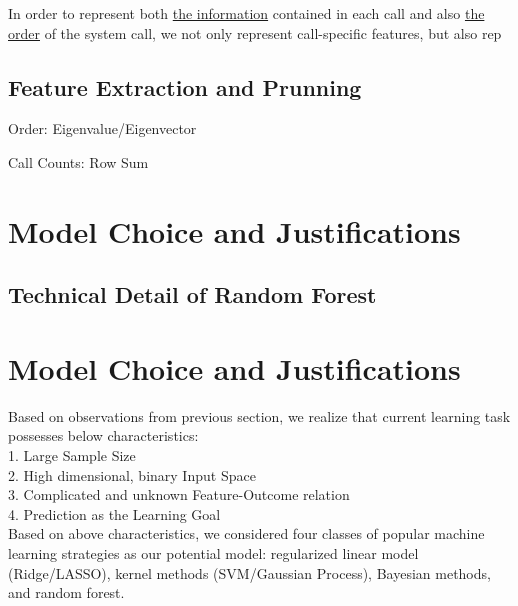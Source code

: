 \documentclass[11pt]{article}
\theoremstyle{definition}
\begin{document}
In order to represent both \underline{the information} contained in each call and also \underline{the order} of the system call, we not only represent call-specific features, but also rep


\subsection{\textbf{Feature Extraction and Prunning}}




Order: Eigenvalue/Eigenvector

Call Counts: Row Sum



\section{\textbf{Model Choice and Justifications}}




\subsection{\textbf{Technical Detail of Random Forest}}







\newpage
\section{\textbf{Model Choice and Justifications}}
Based on observations from previous section, we realize that current learning task possesses below characteristics:\\

1. Large Sample Size\\
2. High dimensional, binary Input Space\\
3. Complicated and unknown Feature-Outcome relation\\
4. Prediction as the Learning Goal\\

Based on above characteristics, we considered four classes of popular machine learning strategies as our potential model: regularized linear model (Ridge/LASSO), kernel methods (SVM/Gaussian Process), Bayesian methods, and random forest.
\end{document}
